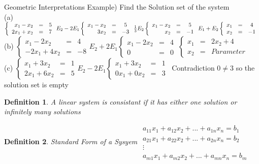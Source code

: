 \documentclass[a4paper,12pt,openany]{book}
\theoremstyle{defn}
\newtheorem{defn}{Definition}[section]
\theoremstyle{expl}
\begin{document}
Geometric Interpretations
Example) Find the Solution set of the system \\
(a) $\left\{ \begin{array}{rcc}
x_1 - x_2 & = & 5 \\
2x_1 + x_2 & = & 7
\end{array} \right.
E_2-2E_1
\left\{ \begin{array}{rcc}
x_1 - x_2 & = & 5 \\
3x_2 & = & -3
\end{array} \right.
\frac{1}{3}E_2
\left\{ \begin{array}{rcc}
x_1 - x_2 & = & 5 \\
x_2 & = & -1
\end{array} \right.\\
E_1+E_2
\left\{ \begin{array}{rcc}
x_1 & = & 4 \\
x_2 & = & -1
\end{array} \right.$\\
(b) $\left\{ \begin{array}{rcc}
x_1 - 2x_2&=& 4 \\
-2x_1 + 4x_2 &=& -8
\end{array} \right.
E_2+2E_1
\left\{ \begin{array}{rcc}
x_1 - 2x_2&=& 4 \\
0&=&0
\end{array} \right.
~\left\{ \begin{array}{rcc}
x_1&=&2x_2+4\\
x_2&=&Parameter
\end{array} \right.
$\\
(c) $\left\{ \begin{array}{rcc}
x_1+3x_2&=&1\\
2x_1+6x_2&=&5
\end{array} \right.
E_2-2E_1
\left\{ \begin{array}{rcc}
x_1+3x_2&=&1\\
0x_1+0x_2&=&3
\end{array} \right.
$~Contradiction $0\neq 3$ so the solution set is empty
\begin{defn}\textup{A linear system is consistant if it has either one solution or infinitely many solutions}\end{defn}
\begin{defn}\textup{Standard Form of a Sysyem}
$\begin{array}{c}
a_{11}x_1+a_{12}x_2+...+a_{1n}x_n = b_1\\
a_{21}x_1+a_{22}x_2+...+a_{2n}x_n = b_2\\
\vdots\\
a_{m1}x_1+a_{m2}x_2+...+a_{mn}x_n = b_m
\end{array}$
\end{defn}
\end{document}
